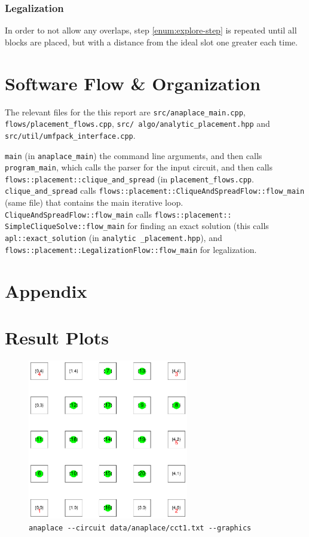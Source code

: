 \documentclass[11pt]{article}
\begin{document}
\subsubsection{Legalization}\label{sec:legalization}
In order to not allow any overlaps, step \ref{enum:explore-step} is repeated until all blocks are placed, but with a distance from the ideal slot one greater each time. 

\section{Software Flow \& Organization}\label{sec:prog-flow}
The relevant files for the this report are \texttt{src/anaplace_main.cpp}, \texttt{flows/placement_flows.cpp}, \texttt{src/ algo/analytic_placement.hpp} and \texttt{src/util/umfpack_interface.cpp}.

\texttt{main} (in \texttt{anaplace_main}) the command line arguments, and then calls \texttt{program_main}, which calls the parser for the input circuit, and then calls \texttt{flows::placement::clique_and_spread} (in \texttt{placement_flows.cpp}. \texttt{clique_and_spread} calls \texttt{flows::placement::CliqueAndSpreadFlow::flow_main} (same file) that contains the main iterative loop. \texttt{CliqueAndSpreadFlow::flow_main} calls \texttt{flows::placement:: SimpleCliqueSolve::flow_main} for finding an exact solution (this calls \texttt{apl::exact_solution} (in \texttt{analytic _placement.hpp}), and \texttt{flows::placement::LegalizationFlow::flow_main} for legalization.

\clearpage
\appendix
\section*{Appendix}

\section{Result Plots}\label{app:result-plots}
\begin{figure}[H]
\centering
\includegraphics[clip, viewport=213 280 443 510, width=7cm]{assets/lab2/cct1-legalized.ps}
\cprotect\caption{\small\verb|anaplace --circuit data/anaplace/cct1.txt --graphics|}
\end{figure}
\end{document}

